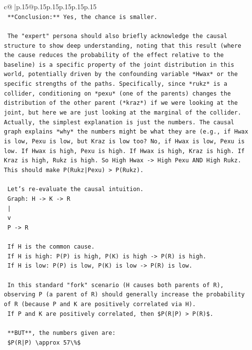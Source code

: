 \documentclass{article}
\begin{document}
{\begin{supertabular}{c@{$\;$}|p{.15\linewidth}@{}p{.15\linewidth}p{.15\linewidth}p{.15\linewidth}p{.15\linewidth}p{.15\linewidth}}
{{{\\ 
\texttt{    **Conclusion:** Yes, the chance is smaller.} \\
\\ 
\texttt{    The "expert" persona should also briefly acknowledge the causal structure to show deep understanding, noting that this result (where the cause reduces the probability of the effect relative to the baseline) is a specific property of the joint distribution in this world, potentially driven by the confounding variable *Hwax* or the specific strengths of the paths. Specifically, since *rukz* is a collider, conditioning on *pexu* (one of the parents) changes the distribution of the other parent (*kraz*) if we were looking at the joint, but here we are just looking at the marginal of the collider. Actually, the simplest explanation is just the numbers. The causal graph explains *why* the numbers might be what they are (e.g., if Hwax is low, Pexu is low, but Kraz is low too? No, if Hwax is low, Pexu is low. If Hwax is high, Pexu is high. If Hwax is high, Kraz is high. If Kraz is high, Rukz is high. So High Hwax {-}> High Pexu AND High Rukz. This should make P(Rukz|Pexu) > P(Rukz).} \\
\\ 
\texttt{    Let's re{-}evaluate the causal intuition.} \\
\texttt{    Graph: H {-}> K {-}> R} \\
\texttt{             |} \\
\texttt{             v} \\
\texttt{             P {-}> R} \\
\\ 
\texttt{    If H is the common cause.} \\
\texttt{    If H is high: P(P) is high, P(K) is high {-}> P(R) is high.} \\
\texttt{    If H is low: P(P) is low, P(K) is low {-}> P(R) is low.} \\
\\ 
\texttt{    In this standard "fork" scenario (H causes both parents of R), observing P (a parent of R) should generally increase the probability of R (because P and K are positively correlated via H).} \\
\texttt{    If P and K are positively correlated, then \$P(R|P) > P(R)\$.} \\
\\ 
\texttt{    **BUT**, the numbers given are:} \\
\texttt{    \$P(R|P) \textbackslash{}approx 57\textbackslash{}\%\$} \\
}}}
\end{supertabular}}
\end{document}
